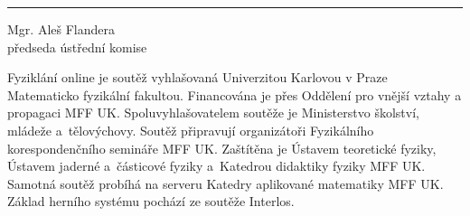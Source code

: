 \documentclass[8pt,a4paper,portrait]{article}
\newcommand{\PismoPaticka}{\fontsize{8}{10}\selectfont}
\newcommand{\PismoOsoby}{\fontsize{10}{10}\selectfont}
\newcommand{\MezeraCara}{\vspace{0.3cm}}
\newcommand{\MezeraPodpisy}{\vspace{1.5cm}}
\newcommand{\osobaLeva}{Oldřich Holcner}
\newcommand{\osobaPrava}{Mgr. Aleš Flandera}
\newcommand{\OsobaLevaFceCZ}{vedoucí Fyziklání online}
\newcommand{\OsobaPravaFceCZ}{předseda ústřední komise}
\begin{document}
{{\begin{center}



%
\MezeraPodpisy
\begin{minipage}{0.25\textwidth}
\end{minipage}
%
\hspace{8cm}
%
\begin{minipage}{0.25\textwidth}
\centering
\hrule
\MezeraCara
{\PismoOsoby
\osobaPrava\\
\OsobaPravaFceCZ
}
\end{minipage}
%
\end{center}
%
\vfill
{\PismoPaticka \noindent{}Fyziklání online je soutěž vyhlašovaná Univerzitou Karlovou v Praze Matematicko fyzikální fakultou. Financována je přes Oddělení pro vnější vztahy a propagaci MFF UK. Spoluvyhlašovatelem soutěže je Ministerstvo školství, mládeže a~tělovýchovy. Soutěž připravují organizátoři Fyzikálního korespondenčního semináře MFF UK. Zaštítěna je Ústavem teoretické fyziky, Ústavem jaderné a~částicové fyziky a~Katedrou didaktiky fyziky MFF UK. Samotná soutěž probíhá na serveru Katedry aplikované matematiky MFF UK. Základ herního systému pochází ze soutěže Interlos.}


	{\label{page-A}}
	{
		{\label{page-B}}
		{\label{page-C}}}
}
	

\newpage
} %
%
\end{document}

